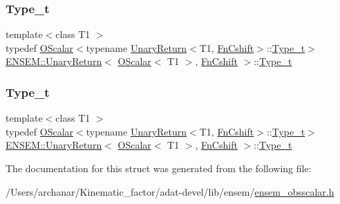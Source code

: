 \subsubsection{\texorpdfstring{Type\_t}{Type\_t}\hspace{0.1cm}{\footnotesize\ttfamily [2/3]}}
{\footnotesize\ttfamily template$<$class T1 $>$ \\
typedef \mbox{\hyperlink{classENSEM_1_1OScalar}{O\+Scalar}}$<$typename \mbox{\hyperlink{structENSEM_1_1UnaryReturn}{Unary\+Return}}$<$T1, \mbox{\hyperlink{structENSEM_1_1FnCshift}{Fn\+Cshift}}$>$\+::\mbox{\hyperlink{structENSEM_1_1UnaryReturn_3_01OScalar_3_01T1_01_4_00_01FnCshift_01_4_a98d26d4e3352558b80bc62389e24a27d}{Type\+\_\+t}}$>$ \mbox{\hyperlink{structENSEM_1_1UnaryReturn}{E\+N\+S\+E\+M\+::\+Unary\+Return}}$<$ \mbox{\hyperlink{classENSEM_1_1OScalar}{O\+Scalar}}$<$ T1 $>$, \mbox{\hyperlink{structENSEM_1_1FnCshift}{Fn\+Cshift}} $>$\+::\mbox{\hyperlink{structENSEM_1_1UnaryReturn_3_01OScalar_3_01T1_01_4_00_01FnCshift_01_4_a98d26d4e3352558b80bc62389e24a27d}{Type\+\_\+t}}}

\mbox{\label{structENSEM_1_1UnaryReturn_3_01OScalar_3_01T1_01_4_00_01FnCshift_01_4_a98d26d4e3352558b80bc62389e24a27d}} 
\subsubsection{\texorpdfstring{Type\_t}{Type\_t}\hspace{0.1cm}{\footnotesize\ttfamily [3/3]}}
{\footnotesize\ttfamily template$<$class T1 $>$ \\
typedef \mbox{\hyperlink{classENSEM_1_1OScalar}{O\+Scalar}}$<$typename \mbox{\hyperlink{structENSEM_1_1UnaryReturn}{Unary\+Return}}$<$T1, \mbox{\hyperlink{structENSEM_1_1FnCshift}{Fn\+Cshift}}$>$\+::\mbox{\hyperlink{structENSEM_1_1UnaryReturn_3_01OScalar_3_01T1_01_4_00_01FnCshift_01_4_a98d26d4e3352558b80bc62389e24a27d}{Type\+\_\+t}}$>$ \mbox{\hyperlink{structENSEM_1_1UnaryReturn}{E\+N\+S\+E\+M\+::\+Unary\+Return}}$<$ \mbox{\hyperlink{classENSEM_1_1OScalar}{O\+Scalar}}$<$ T1 $>$, \mbox{\hyperlink{structENSEM_1_1FnCshift}{Fn\+Cshift}} $>$\+::\mbox{\hyperlink{structENSEM_1_1UnaryReturn_3_01OScalar_3_01T1_01_4_00_01FnCshift_01_4_a98d26d4e3352558b80bc62389e24a27d}{Type\+\_\+t}}}



The documentation for this struct was generated from the following file\+:\begin{DoxyCompactItemize}
\item 
/\+Users/archanar/\+Kinematic\+\_\+factor/adat-\/devel/lib/ensem/\mbox{\hyperlink{adat-devel_2lib_2ensem_2ensem__obsscalar_8h}{ensem\+\_\+obsscalar.\+h}}\end{DoxyCompactItemize}
